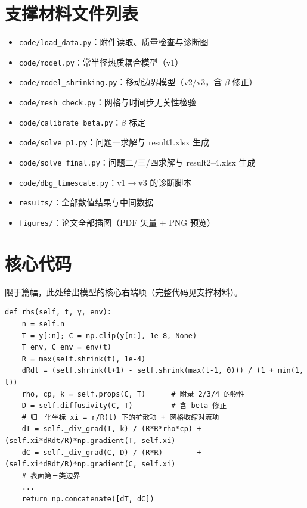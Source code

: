 \documentclass[withoutpreface,bwprint]{cumcmthesis}
\begin{document}
\appendix
\section{支撑材料文件列表}
\begin{itemize}
  \item \texttt{code/load\_data.py}：附件读取、质量检查与诊断图
  \item \texttt{code/model.py}：常半径热质耦合模型（v1）
  \item \texttt{code/model\_shrinking.py}：移动边界模型（v2/v3，含 $\beta$ 修正）
  \item \texttt{code/mesh\_check.py}：网格与时间步无关性检验
  \item \texttt{code/calibrate\_beta.py}：$\beta$ 标定
  \item \texttt{code/solve\_p1.py}：问题一求解与 result1.xlsx 生成
  \item \texttt{code/solve\_final.py}：问题二/三/四求解与 result2--4.xlsx 生成
  \item \texttt{code/dbg\_timescale.py}：v1$\to$v3 的诊断脚本
  \item \texttt{results/}：全部数值结果与中间数据
  \item \texttt{figures/}：论文全部插图（PDF 矢量 + PNG 预览）
\end{itemize}

\section{核心代码}
限于篇幅，此处给出模型的核心右端项（完整代码见支撑材料）。

\begin{verbatim}
def rhs(self, t, y, env):
    n = self.n
    T = y[:n]; C = np.clip(y[n:], 1e-8, None)
    T_env, C_env = env(t)
    R = max(self.shrink(t), 1e-4)
    dRdt = (self.shrink(t+1) - self.shrink(max(t-1, 0))) / (1 + min(1, t))
    rho, cp, k = self.props(C, T)      # 附录 2/3/4 的物性
    D = self.diffusivity(C, T)         # 含 beta 修正
    # 归一化坐标 xi = r/R(t) 下的扩散项 + 网格收缩对流项
    dT = self._div_grad(T, k) / (R*R*rho*cp) + (self.xi*dRdt/R)*np.gradient(T, self.xi)
    dC = self._div_grad(C, D) / (R*R)        + (self.xi*dRdt/R)*np.gradient(C, self.xi)
    # 表面第三类边界
    ...
    return np.concatenate([dT, dC])
\end{verbatim}
\end{document}

